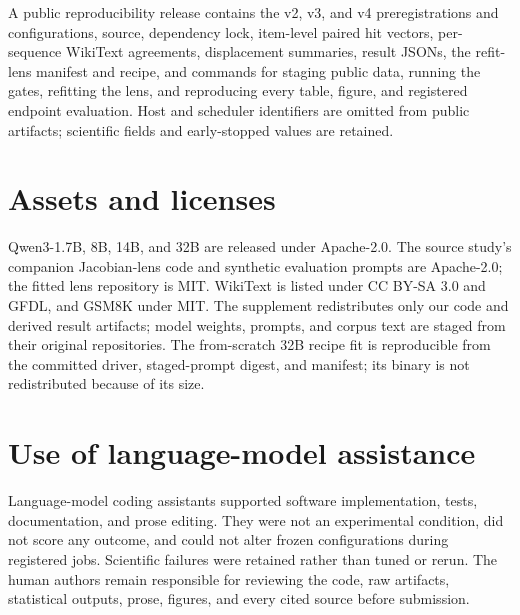 \documentclass{article}
\begin{document}
A public reproducibility release contains the v2, v3, and v4 preregistrations and configurations,
source, dependency lock, item-level paired hit vectors, per-sequence WikiText agreements,
displacement summaries, result JSONs, the refit-lens manifest and recipe, and commands
for staging public data, running the gates, refitting the lens, and reproducing every
table, figure, and registered endpoint evaluation. Host and scheduler identifiers are
omitted from public artifacts; scientific fields and early-stopped values are retained.

\section{Assets and licenses}
\label{app:assets}

Qwen3-1.7B, 8B, 14B, and 32B are released under Apache-2.0. The source study's companion Jacobian-lens
code and synthetic evaluation prompts are Apache-2.0; the fitted lens repository is MIT.
WikiText is listed under CC BY-SA 3.0 and GFDL, and GSM8K under MIT. The supplement
redistributes only our code and derived result artifacts; model weights, prompts, and
corpus text are staged from their original repositories. The from-scratch 32B recipe fit is
reproducible from the committed driver, staged-prompt digest, and manifest; its binary is
not redistributed because of its size.

\section{Use of language-model assistance}
\label{app:llm}

Language-model coding assistants supported software implementation, tests, documentation,
and prose editing. They were not an experimental condition, did not score any outcome,
and could not alter frozen configurations during registered jobs. Scientific failures
were retained rather than tuned or rerun. The human authors remain responsible for
reviewing the code, raw artifacts, statistical outputs, prose, figures, and every cited
source before submission.
\end{document}
